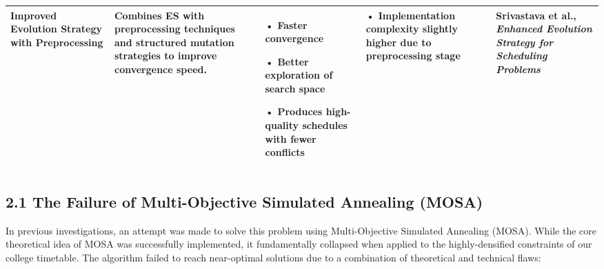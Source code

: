 \documentclass{article}
\begin{document}
\begin{table}[htbp]
\begin{tabularx}{\textwidth}{|>{\RaggedRight\arraybackslash}p{2.5cm}|>{\RaggedRight\arraybackslash}X|>{\RaggedRight\arraybackslash}X|>{\RaggedRight\arraybackslash}X|>{\RaggedRight\arraybackslash}p{2.5cm}|}
        \textbf{Improved Evolution Strategy with Preprocessing} & 
        Combines ES with preprocessing techniques and structured mutation strategies to improve convergence speed. & 
        • Faster convergence \par • Better exploration of search space \par • Produces high-quality schedules with fewer conflicts & 
        • Implementation complexity slightly higher due to preprocessing stage & 
        Srivastava et al., \textit{Enhanced Evolution Strategy for Scheduling Problems} \\ \hline
    \end{tabularx}
\end{table}

\subsection*{2.1 The Failure of Multi-Objective Simulated Annealing (MOSA)}
In previous investigations, an attempt was made to solve this problem using Multi-Objective Simulated Annealing (MOSA). While the core theoretical idea of MOSA was successfully implemented, it fundamentally collapsed when applied to the highly-densified constraints of our college timetable. The algorithm failed to reach near-optimal solutions due to a combination of theoretical and technical flaws:
\end{document}
